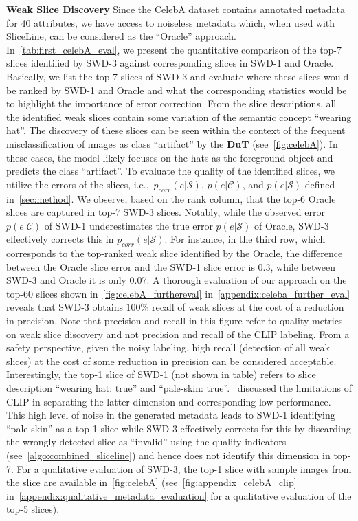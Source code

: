 \textbf{Weak Slice Discovery}
Since the CelebA dataset contains annotated metadata for 40 attributes, we have access to noiseless metadata which, when used with SliceLine, can be considered as the ``Oracle'' approach. In~\cref{tab:first_celebA_eval}, we present the quantitative comparison of the top-7 slices identified by SWD-3 against corresponding slices in SWD-1 and Oracle. Basically, we list the top-7 slices of SWD-3 and evaluate where these slices would be ranked by SWD-1 and Oracle and what the corresponding statistics would be to highlight the importance of error correction. 
From the slice descriptions, all the identified weak slices contain some variation of the semantic concept ``wearing hat''. 
The discovery of these slices can be seen within the context of the frequent misclassification of images as class ``artifact'' by the \textbf{DuT} (see~\cref{fig:celebA}). 
In these cases, the model likely focuses on the hats as the foreground object and predicts the class ``artifact''.
To evaluate the quality of the identified slices, we utilize the errors of the slices, i.e.,\ $p_{corr}(e|\mathcal{S})$, $p(e|\mathcal{C})$, and $p(e|\mathcal{S})$ defined in~\cref{sec:method}.
We observe, based on the rank column, that the top-6 Oracle slices are captured in top-7 SWD-3 slices. Notably, while the observed error $p(e|\mathcal{C})$ of SWD-1 underestimates the true error $p(e|\mathcal{S})$ of Oracle, SWD-3 effectively corrects this in $p_{corr}(e|\mathcal{S})$. For instance, in the third row, which corresponds to the top-ranked weak slice identified by the Oracle, the difference between the Oracle slice error and the SWD-1 slice error is 0.3, while between SWD-3 and Oracle it is only 0.07. A thorough evaluation of our approach on the top-60 slices shown in~\cref{fig:celebA_furthereval} in~\cref{appendix:celeba_further_eval} reveals that SWD-3 obtains $100\%$ recall of weak slices at the cost of a reduction in precision. Note that precision and recall in this figure refer to quality metrics on weak slice discovery and not precision and recall of the CLIP labeling. From a safety perspective, given the noisy labeling, high recall (detection of all weak slices) at the cost of some reduction in precision can be considered acceptable. Interestingly, the top-1 slice of SWD-1 (not shown in table) refers to slice description ``wearing hat: true'' and ``pale-skin: true''.~\citet{gannamaneni2023investigating} discussed the limitations of CLIP in separating the latter dimension and corresponding low performance. This high level of noise in the generated metadata leads to SWD-1 identifying ``pale-skin'' as a top-1 slice while SWD-3 effectively corrects for this by discarding the wrongly detected slice as ``invalid'' using the quality indicators (see~\cref{algo:combined_sliceline}) and hence does not identify this dimension in top-7. For a qualitative evaluation of SWD-3, the top-1 slice with sample images from the slice are available in~\cref{fig:celebA} (see~\cref{fig:appendix_celebA_clip} in~\cref{appendix:qualitative_metadata_evaluation} for a qualitative evaluation of the top-5 slices).

